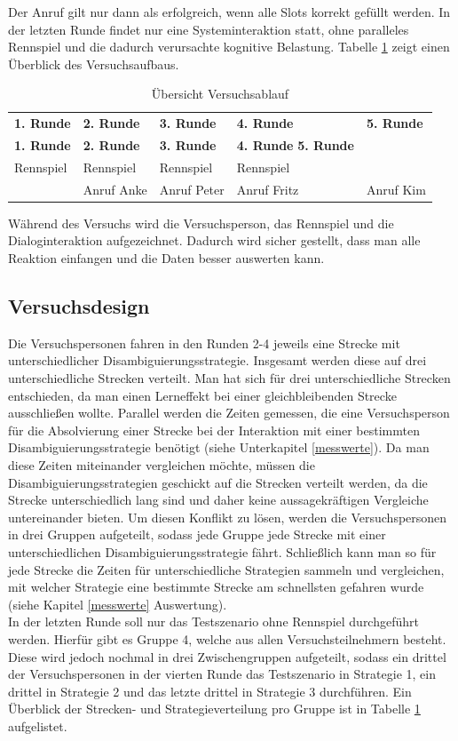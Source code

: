 \documentclass[12pt,a4paper]{scrartcl}
\begin{document}
 Der Anruf gilt nur dann als erfolgreich, wenn alle Slots korrekt gefüllt werden. 
In der letzten Runde findet nur eine Systeminteraktion statt, ohne paralleles Rennspiel und die dadurch verursachte kognitive Belastung. 
Tabelle \ref{ablauf} zeigt einen Überblick des Versuchsaufbaus.

\begin{longtable}{p{}p{}p{}p{}p{} }
	\label{ablauf}\\
	\caption[Übersicht Versuchsablauf]{Übersicht Versuchsablauf}\\
	\hline
	\textbf{1. Runde}&\textbf{2. Runde}&\textbf{3. Runde} &\textbf{4. Runde} & \textbf{5. Runde}\\
	\hline
	\endfirsthead
	\hline
	\textbf{1. Runde}&\textbf{2. Runde}&\textbf{3. Runde} &\textbf{4. Runde} \textbf{5. Runde}\\
	\hline
	\endhead
Rennspiel & Rennspiel & Rennspiel & Rennspiel &\\
 & Anruf Anke & Anruf Peter & Anruf Fritz & Anruf Kim \\
\hline
\end{longtable}
Während des Versuchs wird die Versuchsperson, das Rennspiel und die Dialoginteraktion aufgezeichnet. Dadurch wird sicher gestellt, dass man alle Reaktion einfangen und die Daten besser auswerten kann. 

\subsection{Versuchsdesign}
Die Versuchspersonen fahren in den Runden 2-4 jeweils eine Strecke mit unterschiedlicher Disambiguierungsstrategie. Insgesamt werden diese auf drei unterschiedliche Strecken verteilt. Man hat sich für drei unterschiedliche Strecken entschieden, da man einen Lerneffekt bei einer gleichbleibenden Strecke ausschließen wollte. Parallel  werden die Zeiten gemessen, die eine Versuchsperson für die Absolvierung einer Strecke bei der Interaktion mit einer bestimmten Disambiguierungsstrategie benötigt (siehe Unterkapitel \ref{messwerte}). Da man diese Zeiten miteinander vergleichen möchte, müssen die Disambiguierungsstrategien geschickt auf die Strecken verteilt werden, da die Strecke unterschiedlich lang sind und daher keine aussagekräftigen Vergleiche untereinander bieten. Um diesen Konflikt zu lösen, werden die Versuchspersonen in drei Gruppen aufgeteilt, sodass jede Gruppe jede Strecke mit einer unterschiedlichen Disambiguierungsstrategie fährt. Schließlich kann man so für jede Strecke die Zeiten für unterschiedliche Strategien sammeln und vergleichen, mit welcher Strategie eine bestimmte Strecke am schnellsten gefahren wurde (siehe Kapitel \ref{messwerte} Auswertung). \\
In der letzten Runde soll nur das Testszenario ohne Rennspiel durchgeführt werden. Hierfür gibt es Gruppe 4, welche aus allen Versuchsteilnehmern besteht. Diese wird jedoch nochmal in drei Zwischengruppen aufgeteilt, sodass ein drittel der Versuchspersonen in der vierten Runde das Testszenario in Strategie 1, ein drittel in Strategie 2 und das letzte drittel in Strategie 3 durchführen. Ein Überblick der Strecken- und Strategieverteilung pro Gruppe ist in Tabelle \ref{ablauf} aufgelistet. 
\end{document}

